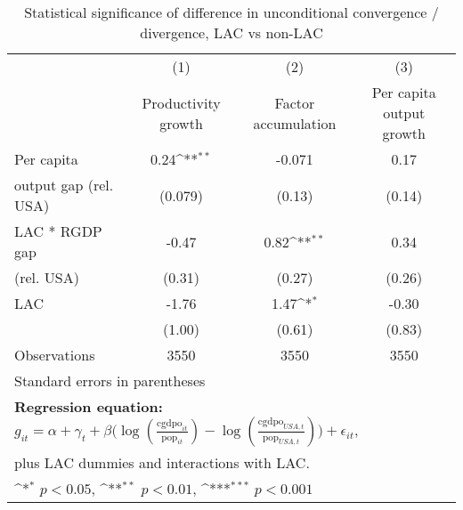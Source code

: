 \begin{table}[htbp]\centering
\def\sym#1{\ifmmode^{#1}\else\(^{#1}\)\fi}
\caption{Statistical significance of difference in unconditional convergence / divergence, LAC vs non-LAC}
\begin{tabular}{l*{3}{c}}
\toprule
                &\multicolumn{1}{c}{(1)}&\multicolumn{1}{c}{(2)}&\multicolumn{1}{c}{(3)}\\
                &\multicolumn{1}{c}{Productivity growth}&\multicolumn{1}{c}{Factor accumulation}&\multicolumn{1}{c}{Per capita output growth}\\
\midrule
Per capita      &     0.24\sym{**} &   -0.071         &     0.17         \\
output gap (rel. USA)&  (0.079)         &   (0.13)         &   (0.14)         \\
\addlinespace
LAC * RGDP gap  &    -0.47         &     0.82\sym{**} &     0.34         \\
(rel. USA)      &   (0.31)         &   (0.27)         &   (0.26)         \\
\addlinespace
LAC             &    -1.76         &     1.47\sym{*}  &    -0.30         \\
                &   (1.00)         &   (0.61)         &   (0.83)         \\
\midrule
Observations    &     3550         &     3550         &     3550         \\
\bottomrule
\multicolumn{4}{l}{\footnotesize Standard errors in parentheses}\\
\multicolumn{4}{l}{\footnotesize \textbf{Regression equation:} \(g_{it} = \alpha + \gamma_t + \beta \big(\log (\frac{\textrm{cgdpo}_{it}}{\textrm{pop}_{it}} ) - \log (\frac{\textrm{cgdpo}_{USA,t}}{\textrm{pop}_{USA,t}}  ) \big) + \epsilon_{it}\), }\\
\multicolumn{4}{l}{\footnotesize plus LAC dummies and interactions with LAC.}\\
\multicolumn{4}{l}{\footnotesize \sym{*} \(p<0.05\), \sym{**} \(p<0.01\), \sym{***} \(p<0.001\)}\\
\end{tabular}
\end{table}

